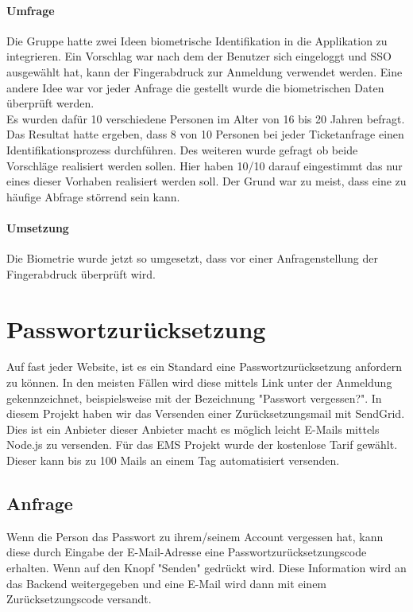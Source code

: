 \paragraph{Umfrage} Die Gruppe hatte zwei Ideen biometrische Identifikation in die Applikation zu integrieren. Ein Vorschlag war nach dem der Benutzer sich eingeloggt und SSO ausgewählt hat, kann der Fingerabdruck zur Anmeldung verwendet werden.
Eine andere Idee war vor jeder Anfrage die gestellt wurde die biometrischen Daten überprüft werden.
\\
Es wurden dafür 10 verschiedene Personen im Alter von 16 bis 20 Jahren befragt. Das Resultat hatte ergeben, dass 8 von 10 Personen bei jeder Ticketanfrage einen Identifikationsprozess durchführen.
Des weiteren wurde gefragt ob beide Vorschläge realisiert werden sollen. Hier haben 10/10 darauf eingestimmt das nur eines dieser Vorhaben realisiert werden soll. Der Grund war zu meist, dass eine zu häufige Abfrage störrend sein kann.

\paragraph{Umsetzung} Die Biometrie wurde jetzt so umgesetzt, dass vor einer Anfragenstellung der Fingerabdruck überprüft wird.

\section{Passwortzurücksetzung}
Auf fast jeder Website, ist es ein Standard eine Passwortzurücksetzung anfordern zu können. In den meisten Fällen wird diese mittels Link unter der Anmeldung gekennzeichnet, beispielsweise mit der Bezeichnung "Passwort vergessen?".
In diesem Projekt haben wir das Versenden einer Zurücksetzungsmail mit SendGrid. Dies ist ein Anbieter dieser Anbieter macht es möglich leicht E-Mails mittels Node.js zu versenden.
Für das EMS Projekt wurde der kostenlose Tarif gewählt. Dieser kann bis zu 100 Mails an einem Tag automatisiert versenden.

\subsection{Anfrage}
Wenn die Person das Passwort zu ihrem/seinem Account vergessen hat, kann diese durch Eingabe der E-Mail-Adresse eine Passwortzurücksetzungscode erhalten. Wenn auf den Knopf "Senden" gedrückt wird.
Diese Information wird an das Backend weitergegeben und eine E-Mail wird dann mit einem Zurücksetzungscode versandt. 

